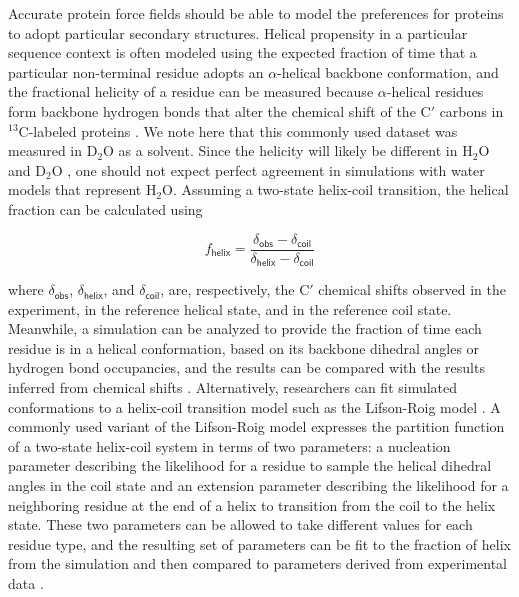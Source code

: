 \documentclass[9pt,review]{livecoms}
\begin{document}
Accurate protein force fields should be able to model the preferences for proteins to adopt particular secondary structures.
Helical propensity in a particular sequence context is often modeled using the expected fraction of time that a particular non-terminal residue adopts an $\alpha$-helical backbone conformation, and the fractional helicity of a residue can be measured because $\alpha$-helical residues form backbone hydrogen bonds that alter the chemical shift of the C$'$ carbons in $^{13}$C-labeled proteins \cite{shalongo_distribution_1994}.
We note here that this commonly used dataset was measured in D$_2$O as a solvent.
Since the helicity will likely be different in H$_2$O and D$_2$O \cite{shi2002d}, one should not expect perfect agreement in simulations with water models that represent H$_2$O.
Assuming a two-state helix-coil transition, the helical fraction can be calculated using

\begin{equation}
\label{eqn:fraction_helix}
f_{\mathsf{helix}} = \frac {\delta_{\mathsf{obs}} - \delta_{\mathsf{coil}}} {\delta_{\mathsf{helix}} - \delta_{\mathsf{coil}}}
\end{equation}

\noindent where $\delta_{\mathsf{obs}}$,  $\delta_{\mathsf{helix}}$, and $\delta_{\mathsf{coil}}$, are, respectively, the C$'$ chemical shifts observed in the experiment, in the reference helical state, and in the reference coil state.
Meanwhile, a simulation can be analyzed to provide the fraction of time each residue is in a helical conformation, based on its backbone dihedral angles or hydrogen bond occupancies, and the results can be compared with the results inferred from chemical shifts \cite{best_optimized_2009}.
Alternatively, researchers can fit simulated conformations to a helix-coil transition model such as the Lifson-Roig model \cite{lifson_theory_1961}.
A commonly used variant of the Lifson-Roig model expresses the partition function of a two-state helix-coil system in terms of two parameters: a nucleation parameter describing the likelihood for a residue to sample the helical dihedral angles in the coil state and an extension parameter describing the likelihood for a neighboring residue at the end of a helix to transition from the coil to the helix state.
These two parameters can be allowed to take different values for each residue type, and the resulting set of parameters can be fit to the fraction of helix from the simulation and then compared to parameters derived from experimental data \cite{best_optimized_2009}.
\end{document}
